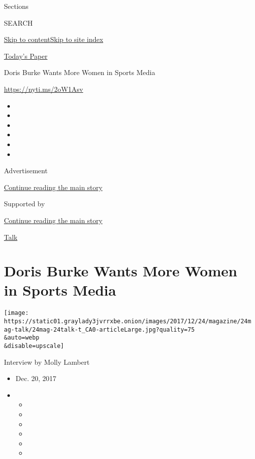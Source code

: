 Sections

SEARCH

\protect\hyperlink{site-content}{Skip to
content}\protect\hyperlink{site-index}{Skip to site index}

\href{https://myaccount.nytimes3xbfgragh.onion/auth/login?response_type=cookie\&client_id=vi}{}

\href{https://www.nytimes3xbfgragh.onion/section/todayspaper}{Today's
Paper}

Doris Burke Wants More Women in Sports Media

\url{https://nyti.ms/2oW1Asv}

\begin{itemize}
\item
\item
\item
\item
\item
\item
\end{itemize}

Advertisement

\protect\hyperlink{after-top}{Continue reading the main story}

Supported by

\protect\hyperlink{after-sponsor}{Continue reading the main story}

\href{/column/magazine-talk}{Talk}

\hypertarget{doris-burke-wants-more-women-in-sports-media}{%
\section{Doris Burke Wants More Women in Sports
Media}\label{doris-burke-wants-more-women-in-sports-media}}

\texttt{[image: https://static01.graylady3jvrrxbe.onion/images/2017/12/24/magazine/24mag-talk/24mag-24talk-t\_CA0-articleLarge.jpg?quality=75\\\&auto=webp\\\&disable=upscale]}

Interview by Molly Lambert

\begin{itemize}
\item
  Dec. 20, 2017
\item
  \begin{itemize}
  \item
  \item
  \item
  \item
  \item
  \item
  \end{itemize}
\end{itemize}

